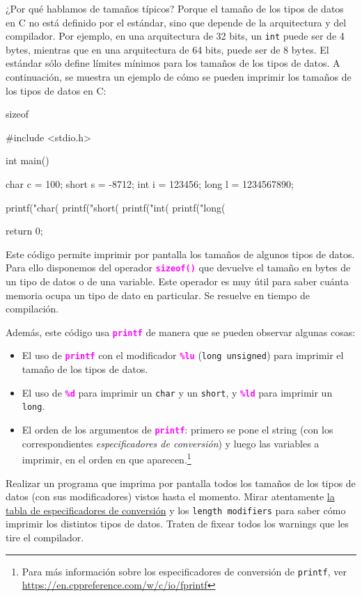 \documentclass[]{scrartcl}
\newcommand{\hl}[1]{\textcolor{magenta}{\textbf{\texttt{#1}}}}
\begin{document}
¿Por qué hablamos de tamaños típicos? Porque el tamaño de los tipos de datos en C no está definido por el estándar, sino que depende de la arquitectura y del compilador. Por ejemplo, en una arquitectura de 32 bits, un \texttt{int} puede ser de 4 bytes, mientras que en una arquitectura de 64 bits, puede ser de 8 bytes.
El estándar sólo define límites mínimos para los tamaños de los tipos de datos. A continuación, se muestra un ejemplo de cómo se pueden imprimir los tamaños de los tipos de datos en C:

\begin{cbox}[]{sizeof}

  #include <stdio.h>
  
  int main() {
  	char c = 100;
  	short s = -8712;
  	int i = 123456;
  	long l = 1234567890;
  
  	printf("char(%
  	printf("short(%
  	printf("int(%
  	printf("long(%
  
  	return 0;
  }

\end{cbox}

Este código permite imprimir por pantalla los tamaños de algunos tipos de datos. Para ello disponemos del operador \hl{sizeof()} que devuelve el tamaño en bytes de un tipo de datos o de una variable. Este operador es muy útil para saber cuánta memoria ocupa un tipo de dato en particular. Se resuelve en tiempo de compilación.

Además, este código usa \hl{printf} de manera que se pueden observar algunas cosas:
\begin{itemize}
  \item El uso de \hl{printf} con el modificador \hl{\%lu} (\texttt{long unsigned}) para imprimir el tamaño de los tipos de datos.
  \item El uso de \hl{\%d} para imprimir un \texttt{char} y un \texttt{short}, y \hl{\%ld} para imprimir un \texttt{long}.
  \item El orden de los argumentos de \hl{printf}: primero se pone el string (con los correspondientes \textit{especificadores de conversión}) y luego las variables a imprimir, en el orden en que aparecen.\footnote{Para más información sobre los especificadores de conversión de \texttt{printf}, ver \url{https://en.cppreference.com/w/c/io/fprintf}}
\end{itemize}

\begin{exbox}[label=ejercicio2]
  Realizar un programa que imprima por pantalla todos los tamaños de los tipos de datos (con sus modificadores) vistos hasta el momento. Mirar atentamente \href{https://en.cppreference.com/w/c/io/fprintf}{la tabla de especificadores de conversión} y los \texttt{length modifiers} para saber cómo imprimir los distintos tipos de datos. Traten de fixear todos los warnings que les tire el compilador.
\end{exbox}
\end{document}
